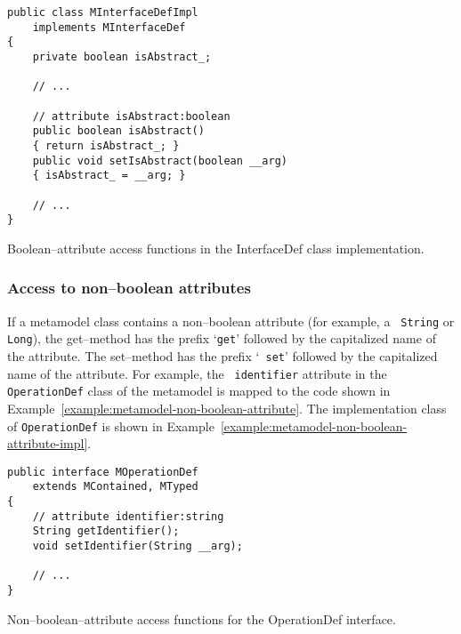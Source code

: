 \begin{Example}
\begin{minifbox}
\begin{small}
\begin{verbatim}
public class MInterfaceDefImpl
    implements MInterfaceDef
{
    private boolean isAbstract_;

    // ...

    // attribute isAbstract:boolean
    public boolean isAbstract()
    { return isAbstract_; }
    public void setIsAbstract(boolean __arg)
    { isAbstract_ = __arg; }

    // ...
}
\end{verbatim}
\end{small}
\end{minifbox}
\caption{Boolean--attribute access functions in the InterfaceDef class
implementation.}
\label{example:metamodel-boolean-attribute-impl}
\end{Example}

\subsubsection{Access to non--boolean attributes}

If a metamodel class contains a non--boolean attribute (for example, a {\tt
String} or {\tt Long}), the get--method has the prefix `{\tt get}' followed by
the capitalized name of the attribute. The set--method has the prefix `{\tt
set}' followed by the capitalized name of the attribute. For example, the {\tt
identifier} attribute in the {\tt OperationDef} class of the metamodel is mapped
to the code shown in Example~\ref{example:metamodel-non-boolean-attribute}. The
implementation class of {\tt OperationDef} is shown in
Example~\ref{example:metamodel-non-boolean-attribute-impl}.

\begin{Example}
\begin{minifbox}
\begin{small}
\begin{verbatim}
public interface MOperationDef
    extends MContained, MTyped
{
    // attribute identifier:string
    String getIdentifier();
    void setIdentifier(String __arg);

    // ...
}
\end{verbatim}
\end{small}
\end{minifbox}
\caption{Non--boolean--attribute access functions for the OperationDef
interface.}
\label{example:metamodel-non-boolean-attribute}
\end{Example}

